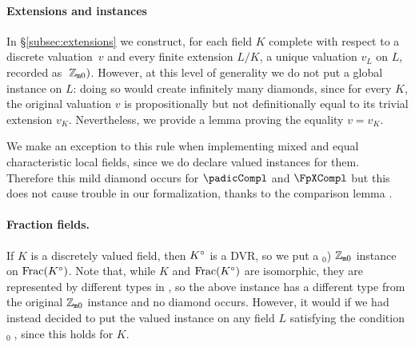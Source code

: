 \documentclass[sigplan,10pt,anonymous,review]{acmart}
\begin{document}
\paragraph{Extensions and  instances}
In \S\ref{subsec:extensions} we construct, for each field $K$ complete with respect to a discrete valuation~$v$ and every finite extension $L/K$, a unique valuation $v_L$ on $L$, recorded as $\;\mathbb{Z}_{\mathtt{m}0})$. However, at this level of generality we do not put a global  instance on $L$: doing so would create infinitely many diamonds, since for every $K$, the original valuation $v$ is propositionally but not definitionally equal to its trivial extension $v_K$. Nevertheless, we provide a lemma \href{https://github.com/LCFT-Lean/local_fields/blob/76ad487d09babdb0018f394a5634526637ee014a/src/discrete_valuation_ring/trivial_extension.lean#L58}{\extlink} proving the equality $v=v_K$.

We make an exception to this rule when implementing mixed and equal characteristic local fields, since we do declare valued instances for them. Therefore this mild diamond occurs for $\padicCompl$ and $\FpXCompl$ but this does not cause trouble in our formalization, thanks to the comparison lemma \href{https://github.com/LCFT-Lean/local_fields/blob/76ad487d09babdb0018f394a5634526637ee014a/src/discrete_valuation_ring/trivial_extension.lean#L58}{\extlink}.

\paragraph{Fraction fields.}
If $K$ is a discretely valued field, then ${K}^\circ$ is a DVR, so we put a \code{[valued (fraction_ring K}$_0$) $\mathbb{Z}_{\mathtt{m}0}$\code{]} instance on $\operatorname{Frac}({K}^\circ)$\href{https://github.com/LCFT-Lean/local_fields/blob/76ad487d09babdb0018f394a5634526637ee014a/src/discrete_valuation_ring/basic.lean#L452}{\extlink}. Note that, while $K$ and $\operatorname{Frac}({K}^\circ)$ are isomorphic, they are represented by different types in \mathlib, so the above  instance has a different type from the original \code{[valued K} $\mathbb{Z}_{\mathtt{m}0}$\code{]} instance and no diamond occurs. However, it would if we had instead decided to put the valued instance on any field $L$ satisfying the condition \code{[is_fraction_ring K}$_0\; $\code{L]}, since this holds for $K$.
\end{document}
